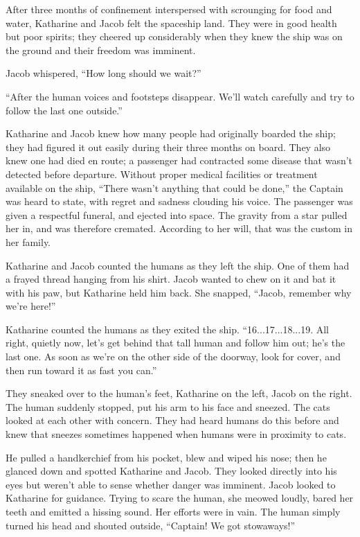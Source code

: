 \timesep

After three months of confinement interspersed with scrounging for food and water, Katharine and Jacob felt the spaceship land. They were in good health but poor spirits; they cheered up considerably when they knew the ship was on the ground and their freedom was imminent.

Jacob whispered, “How long should we wait?”

“After the human voices and footsteps disappear. We'll watch carefully and try to follow the last one outside.”

Katharine and Jacob knew how many people had originally boarded the ship; they had figured it out easily during their three months on board. They also knew one had died en route; a passenger had contracted some disease that wasn't detected before departure. Without proper medical facilities or treatment available on the ship, “There wasn't anything that could be done,” the Captain was heard to state, with regret and sadness clouding his voice. The passenger was given a respectful funeral, and ejected into space. The gravity from a star pulled her in, and was therefore cremated. According to her will, that was the custom in her family.

Katharine and Jacob counted the humans as they left the ship. One of them had a frayed thread hanging from his shirt. Jacob wanted to chew on it and bat it with his paw, but Katharine held him back. She snapped,  “Jacob, remember why we're here!”

Katharine counted the humans as they exited the ship. “16...17...18...19. All right, quietly now, let's get behind that tall human and follow him out; he's the last one. As soon as we're on the other side of the doorway, look for cover, and then run toward it as fast you can.”

They sneaked over to the human's feet, Katharine on the left, Jacob on the right. The human suddenly stopped, put his arm to his face and sneezed. The cats looked at each other with concern. They had heard humans do this before and knew that sneezes sometimes happened when humans were in proximity to cats.

He pulled a handkerchief from his pocket, blew and wiped his nose; then he glanced down and spotted Katharine and Jacob. They looked directly into his eyes but weren't able to sense whether danger was imminent. Jacob looked to Katharine for guidance. Trying to scare the human, she meowed loudly, bared her teeth and emitted a hissing sound. Her efforts were in vain. The human simply turned his head and shouted outside, “Captain! We got stowaways!”

